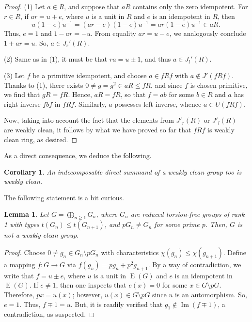 \documentclass{amsart}
\DeclareMathOperator{\im}{Im}
\DeclareMathOperator{\E}{E}
\newtheorem{lemma}[theorem]{Lemma}
\newtheorem{corollary}[theorem]{Corollary}
\theoremstyle{definition}
\theoremstyle{remark}
\numberwithin{equation}{section}
\begin{document}
\begin{proof}
(1) Let $a\in R$, and suppose that $aR$ contains only the zero idempotent. For $r\in R$, if $ar = u + e$, where
$u$ is a unit in $R$ and $e$ is an idempotent in $R$, then
\[
u(1-e)u^{-1} = (ar-e)(1-e)u^{-1} = ar(1-e)u^{-1}\in aR.
\]
Thus, $e=1$ and $1-ar=-u$. From equality $ar=u-e$, we analogously conclude $1+ar=u$. So, $a\in J_r'(R)$.

(2) Same as in (1), it must be that $ra=u\pm 1$, and thus $a\in J_l'(R)$.

(3) Let $f$ be a primitive idempotent, and choose $a\in fRf$ with $a\not\in J'(fRf)$. Thanks to (1), there exists
$0\neq g = g^2\in aR\leq fR$, and since $f$ is chosen primitive, we find that $gR=fR$. Hence, $aR = fR$, so that $f = ab$ for some $b\in R$ and $a$ has right inverse $fbf$ in $fRf$. Similarly, $a$ possesses left inverse, whence $a\in U(fRf)$.

Now, taking into account the fact that the elements from $J'_r(R)$ or $J'_l(R)$ are weakly clean, it follows by what we have proved so far that $fRf$ is weakly clean ring, as desired.
\end{proof}

As a direct consequence, we deduce the following.

\begin{corollary}\label{indecomp}
An indecomposable direct summand of a weakly clean group too is weakly clean.
\end{corollary}

The following statement is a bit curious.

\begin{lemma}
Let $G=\bigoplus_{n\geq 1}G_n$, where $G_n$ are reduced torsion-free groups of rank 1 with types $t(G_n)\leq t(G_{n+1})$, and $pG_n\neq G_n$ for some prime $p$. Then, $G$ is not a weakly clean group.
\end{lemma}

\begin{proof} Choose $0\neq g_n\in G_n\setminus pG_n$ with characteristics $\chi(g_n)\leq\chi(g_{n+1})$. Define a mapping $f: G\to G$ via $f(g_n)=pg_{n}+p^2g_{n+1}$. By a way of contradiction, we write that $f=u\pm e$, where
$u$ is a unit in $\E(G)$ and $e$ is an idempotent in $\E(G)$. If $e\neq 1$, then one inspects that $e(x)=0$ for some
$x\in G\setminus pG$. Therefore, $px=u(x)$; however, $u(x)\in G\setminus pG$ since $u$ is an automorphism. So, $e=1$.
Thus, $f\mp 1=u$. But, it is readily verified that $g_1\notin\im(f\mp 1)$, a contradiction, as suspected.
\end{proof}
\end{document}
